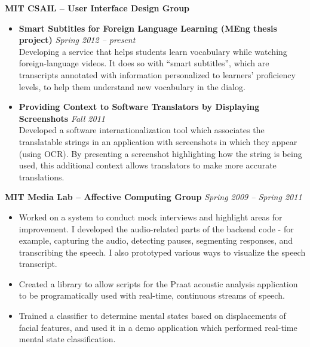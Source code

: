 \documentclass[margin,line]{resume}
\begin{document}
\begin{resume}
\textbf{MIT CSAIL -- User Interface Design Group}
\begin{itemize}
\item \textbf{Smart Subtitles for Foreign Language Learning (MEng thesis project)}  \hfill \textsl{Spring 2012 -- present} \\
Developing a service that helps students learn vocabulary while watching foreign-language videos.
It does so with ``smart subtitles'', which are transcripts annotated with information personalized to learners' proficiency levels, to help them understand new vocabulary in the dialog. %
\item \textbf{Providing Context to Software Translators by Displaying Screenshots}  \hfill \textsl{Fall 2011}\\
Developed a software internationalization tool which associates the translatable strings in an application with screenshots in which they appear (using OCR). By presenting a screenshot highlighting how the string is being used, this additional context allows translators to make more accurate translations.
\end{itemize}


\textbf{MIT Media Lab -- Affective Computing Group} \hfill \textsl{Spring 2009 -- Spring 2011}
\begin{itemize}
\item Worked on a system to conduct mock interviews and highlight areas for improvement. I developed the audio-related parts of the backend code - for example, capturing the audio, detecting pauses, segmenting responses, and transcribing the speech. I also prototyped various ways to visualize the speech transcript.
\item Created a library to allow scripts for the Praat acoustic analysis application to be programatically used with real-time, continuous streams of speech.
\item Trained a classifier to determine mental states based on displacements of facial features, and used it in a demo application which performed real-time mental state classification.
\end{itemize}


\end{resume}
\end{document}

